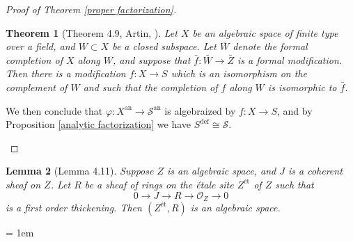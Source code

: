 \documentclass{amsart}
\newtheorem{theorem}{Theorem}[subsection]
\newtheorem{lemma}[theorem]{Lemma}
\theoremstyle{definition}
\numberwithin{equation}{section}
\newcommand{\definable}{\mathrm{def}}
\newcommand{\analytic}{\mathrm{an}}
\begin{document}
\begin{proof}[Proof of Theorem \ref{proper factorization}]
\begin{enumerate}
    \begin{theorem}[Theorem 4.9, Artin, {\cite[Theorem (3.1)]{zbMATH03283964}}]
      Let $X$ be an algebraic space of finite type over a field, and $W\subset X$ be a closed subspace.
      Let $\bar{W}$ denote the formal completion of $X$ along $W$,
      and suppose that $\bar{f}: \bar{W} \to \bar{Z}$ is a formal modification.
      Then there is a modification $f:X \to S$ which is an isomorphism on the complement of $W$
      and such that the completion of $f$ along $W$ is isomorphic to $\bar{f}$.
    \end{theorem}

    We then conclude that $\varphi:X^\analytic \to \mathcal{S}^\analytic$ is algebraized by $f: X \to S$,
    and by Proposition \ref{analytic factorization} we have $S^\definable \cong \mathcal{S}$.
  \end{enumerate}
\end{proof}

\begin{lemma}[Lemma 4.11]
  Suppose $Z$ is an algebraic space,
  and $J$ is a coherent sheaf on $Z$.
  Let $R$ be a sheaf of rings on the {\'e}tale site $Z^{\text{\' et}}$ of $Z$ such that
  \[
    0 \to J \to R \to \mathcal{O}_Z \to 0
  \]
  is a first order thickening.
  Then $(Z^{\text{\'et}},R)$ is an algebraic space.
\end{lemma}

\emergencystretch = 1em
\printbibliography
\end{document}
